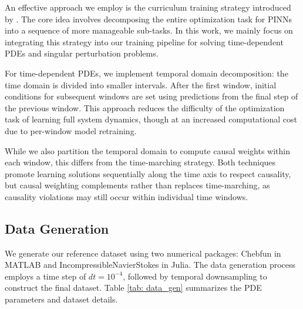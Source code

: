 An effective approach we employ is the curriculum training strategy introduced by \cite{krishnapriyan2021characterizing}. The core idea involves decomposing the entire optimization task for PINNs into a sequence of more manageable sub-tasks. In this work, we mainly focus on  integrating this strategy into our training pipeline for solving time-dependent PDEs and singular perturbation problems. 

For time-dependent PDEs, we implement temporal domain decomposition: the time domain is divided into smaller intervals. After the first window, initial conditions for subsequent windows are set using predictions from the final step of the  previous window.  This approach reduces the difficulty of the optimization task of learning full system dynamics, though at an increased computational cost due to per-window model retraining.

While we also partition the temporal domain to compute causal weights within each window, this differs from the time-marching strategy. Both techniques promote learning solutions sequentially along the time axis to respect causality, but causal weighting complements rather than replaces time-marching, as causality violations may still occur within individual time windows.

\subsection{Data Generation}
We generate our reference dataset using two numerical packages: Chebfun \cite{driscoll2014chebfun} in MATLAB and IncompressibleNavierStokes \cite{Agdestein_IncompressibleNavierStokes_jl_2024} in Julia. The data generation process employs a time step of $dt=10^{-4}$, followed by temporal downsampling to construct the final dataset. Table \ref{tab: data_gen} summarizes the PDE parameters and dataset details.

